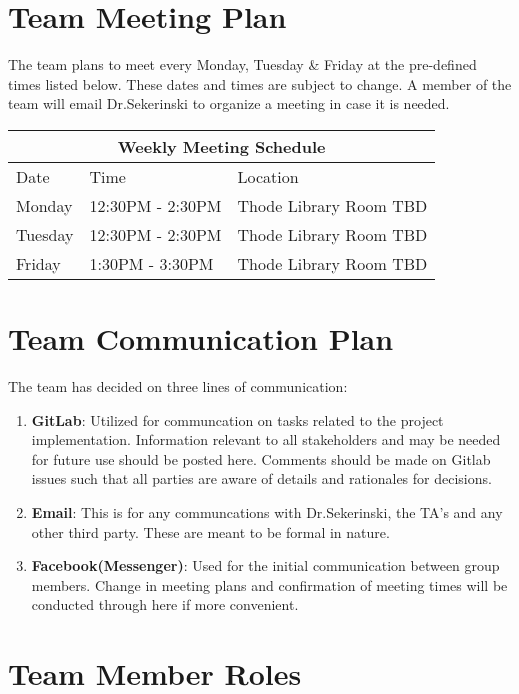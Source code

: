 \documentclass{article}
\begin{document}
\section{Team Meeting Plan}
The team plans to meet every Monday, Tuesday \& Friday at the pre-defined times listed below. These dates and times are subject to change. A member of the team will email Dr.Sekerinski to organize a meeting in case it is needed.\newline 

\begin{tabular}{ |p{2cm}||p{3cm}|p{5cm}|  }
 \hline
 \multicolumn{3}{|c|}{Weekly Meeting Schedule} \\
 \hline
 Date &Time  & Location\\
 \hline
Monday &   12:30PM - 2:30PM   & Thode Library Room TBD\\
Tuesday &   12:30PM - 2:30PM   & Thode Library Room TBD\\
Friday  & 1:30PM - 3:30PM & Thode Library Room TBD\\

 \hline
\end{tabular}
\section{Team Communication Plan}

The team has decided on three lines of communication:

\begin{enumerate}
\item \textbf{GitLab}: Utilized for communcation on tasks related to the project implementation. Information relevant to all stakeholders and may be needed for future use should be posted here.  Comments should be made on Gitlab issues such that all parties are aware of details and rationales for decisions.
\item \textbf{Email}: This is for any communcations with Dr.Sekerinski, the TA's and any other third party. These are meant to be formal in nature.
\item \textbf{Facebook(Messenger)}: Used for the initial communication between group members. Change in meeting plans and confirmation of meeting times will be conducted through here if more convenient.
\end{enumerate}

\section{Team Member Roles}
\end{document}
